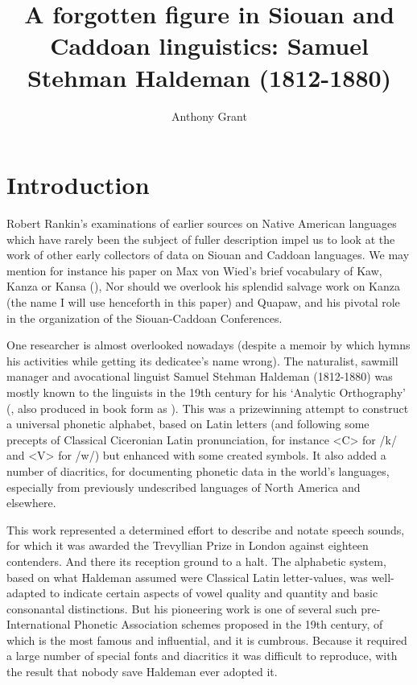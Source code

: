 \documentclass[output=paper]{LSP/langsci}
\author{Anthony Grant}
\title{A forgotten figure in Siouan and Caddoan linguistics:  Samuel Stehman Haldeman (1812-1880)}
\begin{document}
\section{Introduction}

Robert Rankin's examinations of earlier sources on Native American languages which have rarely been the subject of fuller description impel us to look at the work of other early collectors of data on Siouan and Caddoan languages. We may mention for instance his paper on Max von Wied's \nocite{Maximilian18391841} brief vocabulary of Kaw, Kanza or Kansa  (\citealt{Rankin1994}), Nor should we overlook his splendid salvage work on Kanza (the name I will use henceforth in this paper) and Quapaw, and his pivotal role in the organization of the Siouan-Caddoan Conferences.

One researcher is almost overlooked nowadays (despite a memoir by \citealt{Lesley1881} which hymns his activities while getting its dedicatee's name wrong). The naturalist, sawmill manager and avocational linguist Samuel Stehman Haldeman (1812-1880)  was mostly known to the linguists in the 19th century for his `Analytic Orthography' (\citealt{Haldeman1859}, also produced in book form as \citealt{Haldeman1860}). This was a prizewinning attempt to construct a  universal phonetic alphabet, based on Latin letters (and following some precepts of Classical Ciceronian Latin pronunciation, for instance <C> for /k/ and <V> for /w/) but enhanced with some created symbols. It also added a number of diacritics,  for documenting phonetic data in the world's languages, especially from previously undescribed languages of North America and elsewhere.  

This work represented a determined effort to describe and notate speech sounds, for which it was awarded the Trevyllian Prize in London against eighteen contenders. And there its reception ground to a halt. The alphabetic system, based on what Haldeman assumed were Classical Latin letter-values,  was well-adapted to indicate certain aspects of vowel quality and quantity and basic consonantal distinctions. But his pioneering work is one of several such pre-International Phonetic Association  schemes proposed in the 19th century, of which \citet{Lepsius1863} is the most famous and influential, and it is cumbrous.  Because it required a large number of special fonts and diacritics it was difficult to reproduce, with the result that nobody save Haldeman ever adopted it.    
\end{document}

